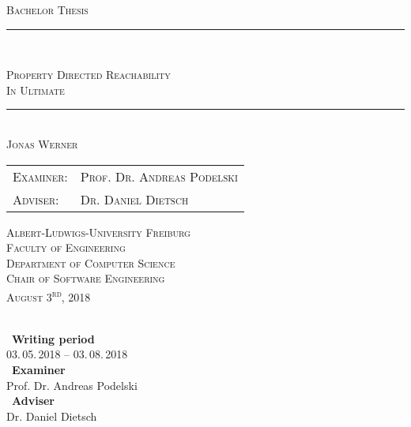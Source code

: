 \documentclass[11pt, a4paper, BCOR=10mm, ngerman]{scrbook}
\begin{document}
\begin{titlepage}
\begin{center}

\newcommand{\HorizontalLine}{\rule{\linewidth}{0.3mm}}

        {\scshape\Large Bachelor Thesis\par}


\HorizontalLine \\[0.4cm]
        {\huge\scshape Property Directed Reachability \\ \Large{In \textsc{Ultimate}} \par}
\HorizontalLine \\[1.5cm]


        {\Large \scshape Jonas Werner}\\[5cm]


\begin{tabular}[scshape]{>{\normalsize}l >{\normalsize}l}
  \scshape Examiner: & \scshape Prof. Dr. Andreas Podelski\\[0.3cm]
  \scshape Adviser: & \scshape Dr. Daniel Dietsch  \\[1.2cm]
\end{tabular}
\vfill  %

\large { \scshape
    Albert-Ludwigs-University Freiburg\\
    Faculty of Engineering\\
    Department of Computer Science\\
    Chair of Software Engineering \\[1cm]

    August 3\textsuperscript{rd}, 2018\\
}
\end{center}
\end{titlepage}

    \pagestyle{plain} %
    \frontmatter  %

\ \vfill \ \\  %
\
\textbf{Writing period}            \smallskip{} \\
03.\,05.\,2018 -- 03.\,08.\,2018   \bigskip{} \\
\
\textbf{Examiner}                  \smallskip{} \\
Prof. Dr. Andreas Podelski \bigskip{} \\
\
\textbf{Adviser}                  \smallskip{} \\
Dr. Daniel Dietsch
\end{document}
